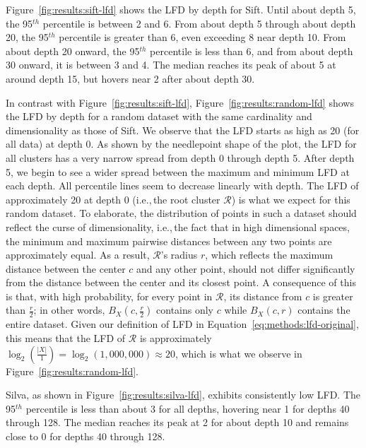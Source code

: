 Figure~\ref{fig:results:sift-lfd} shows the LFD by depth for Sift.
Until about depth 5, the 95$^{th}$ percentile is between 2 and 6.
From about depth 5 through about depth 20, the 95$^{th}$ percentile is greater than 6, even exceeding 8 near depth 10.
From about depth 20 onward, the 95$^{th}$ percentile is less than 6, and from about depth 30 onward, it is between 3 and 4.
The median reaches its peak of about 5 at around depth 15, but hovers near 2 after about depth 30.

In contrast with Figure~\ref{fig:results:sift-lfd}, Figure~\ref{fig:results:random-lfd} shows the LFD by depth for a random dataset with the same cardinality and dimensionality as those of Sift.
We observe that the LFD starts as high as 20 (for all data) at depth 0.
As shown by the needlepoint shape of the plot, the LFD for all clusters has a very narrow spread from depth 0 through depth 5.
After depth 5, we begin to see a wider spread between the maximum and minimum LFD at each depth.
All percentile lines seem to decrease linearly with depth.
The LFD of approximately 20 at depth 0 (i.e.,\,the root cluster $\mathcal{R}$) is what we expect for this random dataset.
To elaborate, the distribution of points in such a dataset should reflect the curse of dimensionality, i.e.,\,the fact that in high dimensional spaces, the minimum and maximum pairwise distances between any two points are approximately equal.
As a result, $\mathcal{R}$'s radius $r$, which reflects the maximum distance between the center $c$ and any other point, should not differ significantly from the distance between the center and its closest point.
A consequence of this is that, with high probability, for every point in $\mathcal{R}$, its distance from $c$ is greater than $\tfrac{r}{2}$;
in other words, $B_X(c, \tfrac{r}{2})$ contains only $c$ while $B_X(c, r)$ contains the entire dataset.
Given our definition of LFD in Equation~\ref{eq:methods:lfd-original}, this means that the LFD of $\mathcal{R}$ is approximately $\log_2(\frac{|X|}{1}) = \log_2(1,000,000) \approx 20$, which is what we observe in Figure~\ref{fig:results:random-lfd}.

Silva, as shown in Figure~\ref{fig:results:silva-lfd}, exhibits consistently low LFD.
The 95$^{th}$ percentile is less than about 3 for all depths, hovering near 1 for depths 40 through 128.
The median reaches its peak at 2 for about depth 10 and remains close to 0 for depths 40 through 128.

